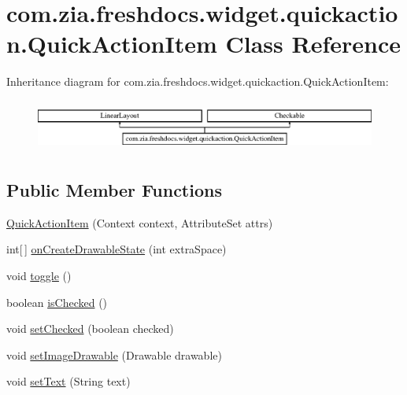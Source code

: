 \hypertarget{classcom_1_1zia_1_1freshdocs_1_1widget_1_1quickaction_1_1_quick_action_item}{\section{com.\-zia.\-freshdocs.\-widget.\-quickaction.\-Quick\-Action\-Item Class Reference}
\label{classcom_1_1zia_1_1freshdocs_1_1widget_1_1quickaction_1_1_quick_action_item}
}
Inheritance diagram for com.\-zia.\-freshdocs.\-widget.\-quickaction.\-Quick\-Action\-Item\-:\begin{figure}[H]
\begin{center}
\leavevmode
\includegraphics[height=1.723077cm]{classcom_1_1zia_1_1freshdocs_1_1widget_1_1quickaction_1_1_quick_action_item}
\end{center}
\end{figure}
\subsection*{Public Member Functions}
\begin{DoxyCompactItemize}
\item 
\hyperlink{classcom_1_1zia_1_1freshdocs_1_1widget_1_1quickaction_1_1_quick_action_item_a844e3f01edc7912e2799ecf2414ada11}{Quick\-Action\-Item} (Context context, Attribute\-Set attrs)
\item 
int\mbox{[}$\,$\mbox{]} \hyperlink{classcom_1_1zia_1_1freshdocs_1_1widget_1_1quickaction_1_1_quick_action_item_a1268094a3cd2af4a0edae87f980c6072}{on\-Create\-Drawable\-State} (int extra\-Space)
\item 
void \hyperlink{classcom_1_1zia_1_1freshdocs_1_1widget_1_1quickaction_1_1_quick_action_item_ab0865aa4a3f21b793bff2a2338b19b78}{toggle} ()
\item 
boolean \hyperlink{classcom_1_1zia_1_1freshdocs_1_1widget_1_1quickaction_1_1_quick_action_item_a7ee9c7aa56609c54e70dcbe7a5e42695}{is\-Checked} ()
\item 
void \hyperlink{classcom_1_1zia_1_1freshdocs_1_1widget_1_1quickaction_1_1_quick_action_item_ad4d21e97c969817103cb5af101d282f8}{set\-Checked} (boolean checked)
\item 
void \hyperlink{classcom_1_1zia_1_1freshdocs_1_1widget_1_1quickaction_1_1_quick_action_item_acebf202f6751fbbfd3282e138f75f219}{set\-Image\-Drawable} (Drawable drawable)
\item 
void \hyperlink{classcom_1_1zia_1_1freshdocs_1_1widget_1_1quickaction_1_1_quick_action_item_a408edfb8d92bec96136a4d573c5f9f99}{set\-Text} (String text)
\end{DoxyCompactItemize}


